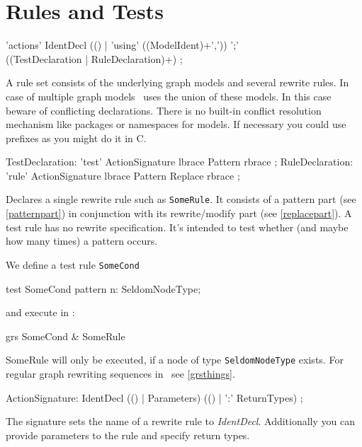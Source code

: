 \section{Rules and Tests}
\label{ruledecls}
\begin{rail}
  'actions' IdentDecl (() | 'using' ((ModelIdent)+',')) ';' \\ ((TestDeclaration | RuleDeclaration)+) ;
\end{rail}
A rule set consists of the underlying graph models and several rewrite rules. In case of multiple graph models \GrG\ uses the union of these models. In this case beware of conflicting declarations. There is no built-in conflict resolution mechanism like packages or namespaces for models. If necessary you could use prefixes as you might do it in C.

\begin{rail}
  TestDeclaration: 'test' ActionSignature lbrace Pattern rbrace ;
  RuleDeclaration: 'rule' ActionSignature lbrace Pattern Replace rbrace ;
\end{rail}
Declares a single rewrite rule such as \texttt{SomeRule}. It consists of a pattern part (see \ref{patternpart}) in conjunction with its rewrite/modify part (see \ref{replacepart}). A test rule has no rewrite specification. It's intended to test whether (and maybe how many times) a pattern occurs.
\begin{example}
We define a test rule \texttt{SomeCond}
\begin{grgen}
test SomeCond {
  pattern {
    n: SeldomNodeType;
  }
}
\end{grgen}
and execute in \GrShell:
\begin{grshell}
  grs SomeCond & SomeRule
\end{grshell}
SomeRule will only be executed, if a node of type \texttt{SeldomNodeType} exists. For regular graph rewriting sequences in \GrShell\ see \ref{grsthings}.
\end{example}

\begin{rail}  
  ActionSignature: IdentDecl (() | Parameters) (() | ':' ReturnTypes) ;
\end{rail}
The signature sets the name of a rewrite rule to \emph{IdentDecl}. Additionally you can provide parameters to the rule and specify return types.

